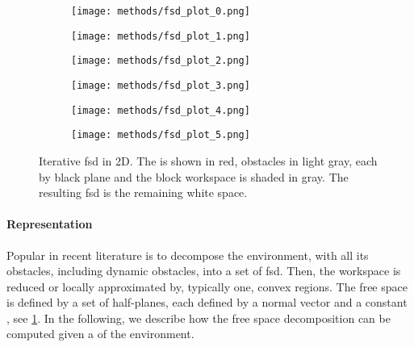 \begin{figure}[ht]
  \centering
  \begin{subfigure}{0.33\linewidth}
    \centering
    \texttt{[image: methods/fsd\_plot\_0.png]}
    \vspace*{0.5em}
  \end{subfigure}%
  \begin{subfigure}{0.33\linewidth}
    \centering
    \texttt{[image: methods/fsd\_plot\_1.png]}
    \vspace*{0.5em}
  \end{subfigure}%
  \begin{subfigure}{0.33\linewidth}
    \centering
    \texttt{[image: methods/fsd\_plot\_2.png]}
    \vspace*{0.5em}
  \end{subfigure}
  \begin{subfigure}{0.33\linewidth}
    \centering
    \texttt{[image: methods/fsd\_plot\_3.png]}
    \vspace*{0.5em}
  \end{subfigure}%
  \begin{subfigure}{0.33\linewidth}
    \centering
    \texttt{[image: methods/fsd\_plot\_4.png]}
    \vspace*{0.5em}
  \end{subfigure}%
  \begin{subfigure}{0.33\linewidth}
    \centering
    \texttt{[image: methods/fsd\_plot\_5.png]}
    \vspace*{0.5em}
  \end{subfigure}%
  \caption{Iterative \acl{fsd} in 2D. The \seed{} is shown in red, obstacles in
    light gray, each \plane{} by black plane and the block workspace is shaded
    in gray. The resulting \acs{fsd} is the remaining white space.
  }%
  \label{fig:fsd}
\end{figure}

\paragraph{Representation}
Popular in recent literature
\cite{Tordesillas2019,Liu2017a,Spahn2021} is to decompose
the environment, with all its obstacles, including dynamic
obstacles, into a set of \ac{fsd}. Then, the workspace is
reduced or locally approximated by, typically one, convex
regions. The free space is defined by a set of half-planes,
each defined by a normal vector \np{} and a constant \cp{},
see \cref{fig:fsd}. In the following, we describe how the
free space decomposition can be computed given a
\pointcloud{} of the environment.

